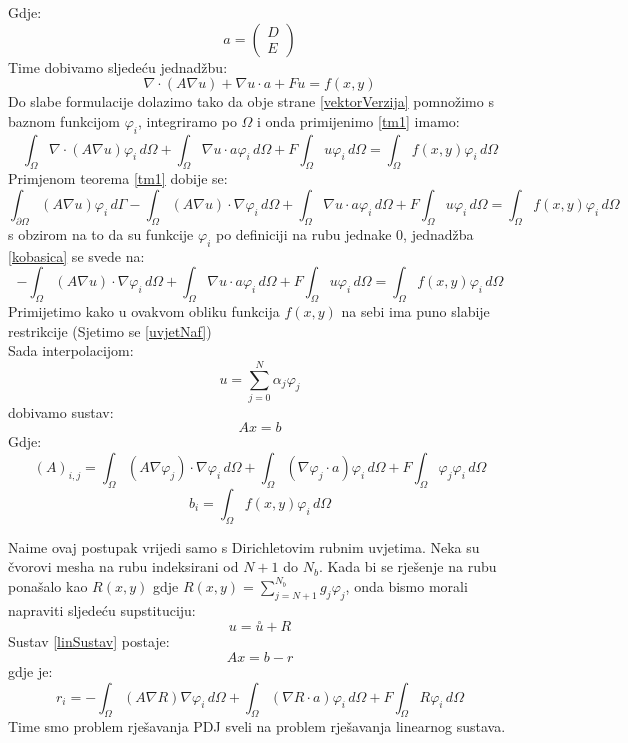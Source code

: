 \documentclass[zavrsnirad]{../fer}
\begin{document}
Gdje:
$$a = 
\begin{pmatrix}
  D\\ 
  E
\end{pmatrix}
$$
Time dobivamo sljedeću jednadžbu:
\begin{equation}
  \label{vektorVerzija}
\nabla \cdot (A \nabla u)  + \nabla u \cdot a + Fu = f(x,y)
\end{equation}
Do slabe formulacije dolazimo tako da obje strane \ref{vektorVerzija} 
pomnožimo
s baznom funkcijom $\varphi_i$, integriramo po $\Omega$
i onda primijenimo  \ref{tm1} 
imamo:
\begin{equation}
  \int_{\Omega}\nabla \cdot (A \nabla u) \varphi_i \, d\Omega  + 
  \int_{\Omega} \nabla u \cdot a\varphi_i \, d\Omega  + F\int_{\Omega}u\varphi_i\,d\Omega  =
  \int_{\Omega}f(x,y)\varphi_i \, d\Omega 
\end{equation}
Primjenom teorema \ref{tm1} 
dobije se:
\begin{equation}
  \label{kobasica}
  \int_{\partial \Omega}(A \nabla u) \varphi_i \, d\Gamma  - 
  \int_{\Omega}(A \nabla u) \cdot \nabla \varphi_i \, d\Omega  + 
  \int_{\Omega} \nabla u \cdot a\varphi_i \, d\Omega  + F\int_{\Omega}u\varphi_i\,d\Omega  =
  \int_{\Omega}f(x,y)\varphi_i \, d\Omega 
\end{equation}
s obzirom na to da su funkcije $\varphi_i$ po definiciji
na rubu jednake $0$, jednadžba 
\ref{kobasica} se 
svede na:
\begin{equation}
  \label{slabaFor}
  -\int_{\Omega}(A \nabla u) \cdot \nabla \varphi_i \, d\Omega  + 
  \int_{\Omega} \nabla u \cdot a\varphi_i \, d\Omega  + F\int_{\Omega}u\varphi_i\,d\Omega  =
  \int_{\Omega}f(x,y)\varphi_i \, d\Omega 
\end{equation}
Primijetimo kako u ovakvom obliku funkcija $f(x,y)$ 
na sebi ima puno slabije restrikcije (Sjetimo se \ref{uvjetNaf})
\bigskip
\\
Sada interpolacijom:
$$u = \sum_{j=0}^N \alpha_j \varphi_j$$
dobivamo sustav:
\begin{equation}
\label{linSustav}
A x = b
\end{equation}
Gdje:
\begin{equation}
\label{elMat}
(A)_{i,j} = \int_{\Omega} (A\nabla \varphi_j) \cdot \nabla \varphi_i \, d\Omega + 
\int_{\Omega} (\nabla \varphi_j \cdot a) \varphi_i \, d\Omega +
F \int_{\Omega} \varphi_j \varphi_i \, d\Omega
\end{equation}
$$b_i = \int_{\Omega} f(x,y) \varphi_i \, d \Omega$$

Naime ovaj postupak vrijedi samo s Dirichletovim
rubnim uvjetima. Neka su čvorovi mesha na rubu indeksirani
od $N+1$ do $N_b$.
Kada bi se rješenje na rubu ponašalo kao
$R(x,y)$ gdje $R(x,y) = \sum_{j=N + 1}^{N_b} g_j \varphi_j$,
onda bismo morali napraviti sljedeću
supstituciju:
$$u = \overset{\circ}u + R$$
Sustav \ref{linSustav}
postaje:
$$Ax = b - r$$
gdje je:
$$r_i = - \int_{\Omega}(A\nabla R) \nabla \varphi_i \, d \Omega +
\int_{\Omega}(\nabla R \cdot a) \varphi_i \, d \Omega +
F \int_{\Omega} R \varphi_i\, d\Omega
$$
Time smo problem rješavanja PDJ sveli na problem
rješavanja linearnog sustava.
\end{document}
